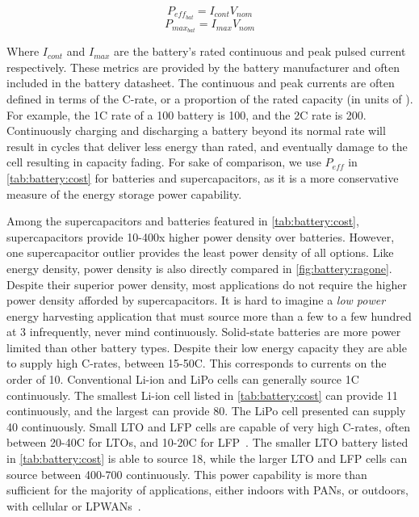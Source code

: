 $$P_{eff_{bat}} = I_{cont} V_{nom}$$
$$P_{max_{bat}} = I_{max} V_{nom}$$

\noindent Where $I_{cont}$ and $I_{max}$ are the battery's rated continuous and peak pulsed current respectively. These metrics are provided by the battery manufacturer and often included in the battery datasheet. The continuous and peak currents are often defined in terms of the C-rate, or a proportion of the rated capacity (in units of \ssi{\Ah}). For example, the 1C rate of a 100\ssi{\milli\Ah} battery is 100\ssi{\milli\ampere}, and the 2C rate is 200\ssi{\milli\ampere}. 
Continuously charging and discharging a battery beyond its normal rate will result in cycles that deliver less energy than rated, and eventually damage to the cell resulting in capacity fading. 
For sake of comparison, we use $P_{eff}$ in \cref{tab:battery:cost} for batteries and supercapacitors, as it is a more conservative measure of the energy storage power capability. 

Among the supercapacitors and batteries featured in \cref{tab:battery:cost}, supercapacitors provide 10-400x higher power density over batteries. 
However, one supercapacitor outlier provides the least power density of all options. Like energy density, power density is also directly compared in \cref{fig:battery:ragone}.
Despite their superior power density, most applications do not require the higher power density afforded by supercapacitors. 
It is hard to imagine a \textit{low power} energy harvesting application that must source more than a few to a few hundred \ssi{\milli\ampere} at 3\ssi{\volt} infrequently, never mind continuously. 
Solid-state batteries are more power limited than other battery types. Despite their low energy capacity they are able to supply high C-rates, between 15-50C. This corresponds to currents on the order of 10\ssi{\milli\ampere}.
Conventional Li-ion and LiPo cells can generally source 1C continuously. The smallest Li-ion cell listed in \cref{tab:battery:cost} can provide 11\ssi{\milli\ampere} continuously, and the largest can provide 80\ssi{\milli\ampere}. The LiPo cell presented can supply 40\ssi{\milli\ampere} continuously. 
Small LTO and LFP cells are capable of very high C-rates, often between 20-40C for LTOs, and 10-20C for LFP~\cite{lifepo4Datasheet,LTODatasheet,LTODatasheet2}.
The smaller LTO battery listed in \cref{tab:battery:cost} is able to source 18\ssi{\milli\ampere}, while the larger LTO and LFP cells can source between 400-700\ssi{\milli\ampere} continuously. 
This power capability is more than sufficient for the majority of applications, either indoors with PANs, or outdoors, with cellular or LPWANs~\cite{nrf52840,ghena2019challenge}.

